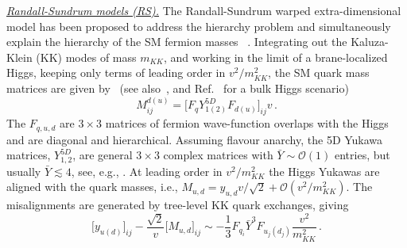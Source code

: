 \documentclass[../report.tex]{subfiles}
\begin{document}
\underline{\it Randall-Sundrum models (RS).}
The Randall-Sundrum warped extra-dimensional model has been proposed to address
the hierarchy problem and simultaneously explain the hierarchy of the SM fermion
masses ~\cite{Randall:1999ee, Gherghetta:2000qt, Grossman:1999ra, Huber:2000ie,
	Huber:2003tu}. Integrating out the Kaluza-Klein (KK) modes of mass $m_{KK}$, and
working in the limit of a brane-localized Higgs, keeping only terms of leading
order in $v^2/m_{KK}^2$, the SM quark mass matrices are given
by~\cite{Azatov:2009na} (see also~\cite{Casagrande:2008hr, Bauer:2009cf,
	Malm:2013jia, Archer:2014jca, Blanke:2008zb, Blanke:2008yr, Albrecht:2009xr,
	Agashe:2006wa, Agashe:2014jca}, and Ref.~\cite{Dillon:2014zea} for a bulk Higgs
scenario) \begin{equation}\label{eq:RS:Mdu} M^{d(u)}_{ij}=\big[F_q
	Y_{1(2)}^{5D}F_{d(u)}\big]_{ij} v\,. \end{equation} The $F_{q,u,d}$ are $3\times
3$ matrices of fermion wave-function overlaps with the Higgs and are diagonal
and hierarchical. Assuming flavour anarchy, the 5D Yukawa matrices,
$Y_{1,2}^{5D}$, are general $3\times 3$ complex matrices with $\bar Y\sim
{\mathcal O}(1)$ entries, but usually $\bar Y \lesssim 4$, see, e.g.,
\cite{Archer:2014jca}. At leading order in $v^2/m_{KK}^2$ the Higgs Yukawas are
aligned with the quark masses, i.e., $M_{u,d}=y_{u,d} v/{\sqrt2}+{\mathcal
	O}(v^2/m_{KK}^2)$. The misalignments are generated by tree-level KK quark
exchanges, giving \begin{equation}\label{eq:misalignment}
	\big[y_{u(d)}\big]_{ij}-\frac{\sqrt2}{v}\big[M_{u,d}\big]_{ij}\sim -
	\frac{1}{3}F_{q_i} \bar Y^3 F_{u_j(d_j)}\frac{v^2}{m_{KK}^2}\,. \end{equation}
\end{document}
